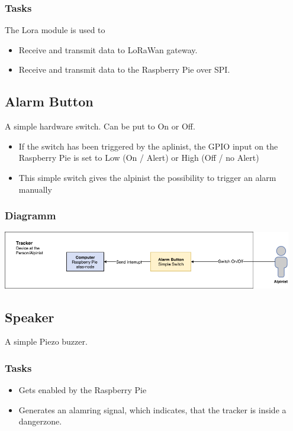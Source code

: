\documentclass[a4paper,11pt, oneside]{report}
\theoremstyle{definition}
\begin{document}
\subsubsection{Tasks}
The Lora module is used to
\begin{itemize}
\item Receive and transmit data to LoRaWan gateway.
\item Receive and transmit data to the Raspberry Pie over SPI.
\end{itemize}

\newpage
\subsection{Alarm Button}
A simple hardware switch. Can be put to On or Off.
\begin{itemize}
\item If the switch has been triggered by the aplinist, the GPIO input on the Raspberry Pie is set to Low (On / Alert) or High (Off / no Alert)
\item This simple switch gives the alpinist the possibility to trigger an alarm manually
\end{itemize}

\subsubsection{Diagramm}
\includegraphics[width=0.95\textwidth]{img/ATAS_SystemOverview_Detail_AlarmButton.png}

\subsection{Speaker}
A simple Piezo buzzer.
\subsubsection{Tasks}
\begin{itemize}
\item Gets enabled by the Raspberry Pie
\item Generates an alamring signal, which indicates, that the tracker is inside a dangerzone.
\end{itemize}
\end{document}
